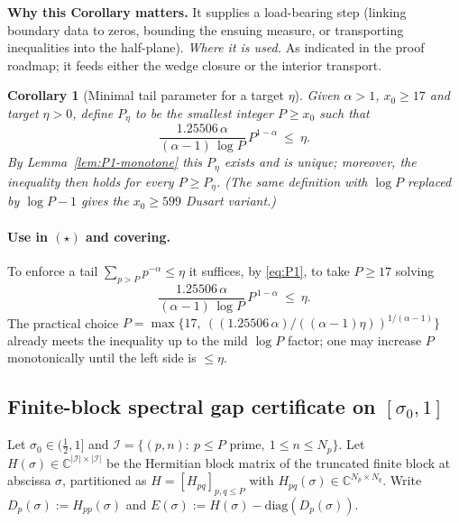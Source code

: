 \documentclass[11pt]{article}
\newtheorem{corollary}{Corollary}[section]
\theoremstyle{definition}
\theoremstyle{remark}
\newcommand{\C}{\mathbb{C}}
\begin{document}
\vspace{1.0cm}
\noindent\textbf{Why this Corollary matters.} It supplies a load-bearing step (linking boundary data to zeros, bounding the ensuing measure, or transporting inequalities into the half-plane).
\noindent\textit{Where it is used.} As indicated in the proof roadmap; it feeds either the wedge closure or the interior transport.
\begin{corollary}[Minimal tail parameter for a target $\eta$]\label{cor:P1-minP}
Given $\alpha>1$, $x_0\ge 17$ and target $\eta>0$, define $P_\eta$ to be the smallest integer $P\ge x_0$ such that
\[
\frac{1.25506\,\alpha}{(\alpha-1)\,\log P}\,P^{1-\alpha}\ \le\ \eta.
\]
By Lemma~\ref{lem:P1-monotone} this $P_\eta$ exists and is unique; moreover, the inequality then holds for every $P\ge P_\eta$. (The same definition with $\log P$ replaced by $\log P-1$ gives the $x_0\ge 599$ Dusart variant.)
\end{corollary}




\vspace{1.0cm}
\paragraph{Use in $(\star)$ and covering.}
To enforce a tail $\sum_{p>P}p^{-\alpha}\le \eta$ it suffices, by \eqref{eq:P1}, to take $P\ge17$ solving
\[
 \frac{1.25506\,\alpha}{(\alpha-1)\,\log P}\,P^{\,1-\alpha}\ \le\ \eta.
\]
The practical choice $P=\max\{17,\ ((1.25506\,\alpha)/((\alpha-1)\eta))^{1/(\alpha-1)}\}$ already meets the inequality up to the mild $\log P$ factor; one may increase $P$ monotonically until the left side is $\le\eta$.






\vspace{1.0cm}
\subsection*{Finite-block spectral gap certificate on $[\sigma_0,1]$}
Let $\sigma_0\in(\tfrac12,1]$ and $\mathcal I=\{(p,n):\ p\le P\text{ prime},\ 1\le n\le N_p\}$. Let $H(\sigma)\in\C^{|\mathcal I|\times|\mathcal I|}$ be the Hermitian block matrix of the truncated finite block at abscissa $\sigma$, partitioned as $H=[H_{pq}]_{p,q\le P}$ with $H_{pq}(\sigma)\in\C^{N_p\times N_q}$. Write $D_p(\sigma):=H_{pp}(\sigma)$ and $E(\sigma):=H(\sigma)-\mathrm{diag}(D_p(\sigma))$.
\end{document}
